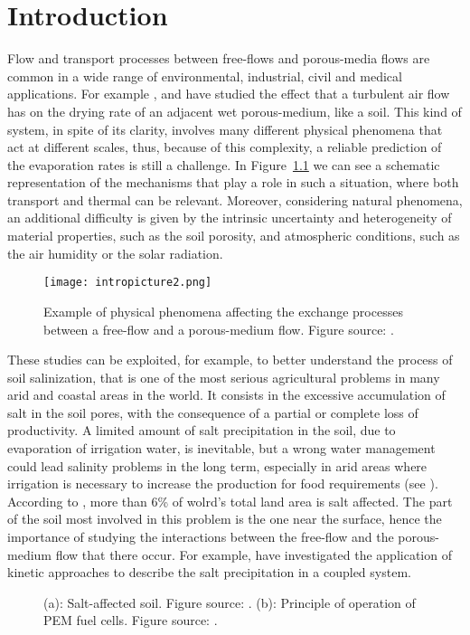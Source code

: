 \chapter{Introduction}
Flow and transport processes between free-flows and porous-media 
flows are common in a wide range of environmental, industrial, civil and medical 
applications.
For example \textcite{tesi:mosthaf}, \textcite{intro:davarzani} and \textcite  {tesi:fetzer} have studied the effect that a turbulent air flow has on the 
drying rate of an adjacent wet porous-medium, like a soil. This kind of system, 
in spite of its clarity, involves many different physical phenomena that act at 
different scales, thus, because of this complexity, a reliable prediction of 
the evaporation rates is still a challenge. In Figure~\ref{fig:intro} we can 
see a schematic representation of the mechanisms that play a role in such a 
situation, where both transport and thermal can be relevant. 
Moreover, considering natural phenomena, an additional difficulty is given by 
the intrinsic uncertainty and heterogeneity of material properties, such as the 
soil porosity, and atmospheric conditions, such as the air humidity or the 
solar radiation.
\begin{figure}[ht]
	\centering
	\texttt{[image: intropicture2.png]}
	\caption[Exchange processes between free and porous-medium 
	flows]{Example of physical phenomena affecting the exchange processes 
		between a free-flow and a porous-medium flow. Figure source: 
		\cite{tesi:fetzer}.}
	\label{fig:intro}
\end{figure}

These studies can be exploited, for example, to better understand the process of soil salinization, that is one of the most serious agricultural problems in many arid and coastal areas in the world. It consists in the excessive accumulation of salt in the soil pores, with the consequence of a partial or complete loss of productivity. A limited amount of salt precipitation in the soil, due to evaporation of irrigation water, is inevitable, but a wrong water management could lead salinity problems in the long term, especially in arid areas where irrigation is necessary to increase the production for food requirements (see \cite{web:fao}). According to \cite{soil:munns}, more than 6\% of wolrd's total land area is salt affected.
The part of the soil most involved in this problem is the one near the surface, hence the importance of studying the interactions between the free-flow and the porous-medium flow that there occur. For example, \textcite{intro:salinization} have investigated the application of kinetic approaches to describe the salt precipitation in a coupled system.
\begin{figure}
	\centering
	\caption{(a): Salt-affected soil. Figure source: \cite{web:fao}. (b): Principle of operation of PEM fuel cells. Figure source: \cite{intro:pemfig}.}
	\label{fig:intro2}
\end{figure}


